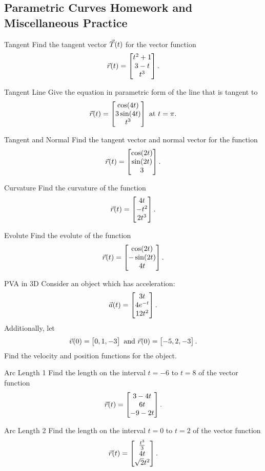 \renewcommand\thesubsection{\thesection.\Alph{subsection}}
\setcounter{subsection}{17}
\subsection{Parametric Curves Homework and Miscellaneous Practice}

\begin{pexercise}{Tangent}%
Find the tangent vector $\vec{T}(t)$ for the vector function $$\vec{r}(t)=\begin{bmatrix}t^2+1\\3-t\\t^3\end{bmatrix}.$$
\end{pexercise}

\begin{pexercise}{Tangent Line}%
Give the equation in parametric form of the line that is tangent to $$\vec{r}(t)=\begin{bmatrix}\cos(4t)\\ 3\sin(4t)\\ t^3\end{bmatrix}\text{ at } t=\pi.$$
\end{pexercise}

\begin{exercise}{Tangent and Normal}
Find the tangent vector and normal vector for the function $$\vec{r}(t)=\begin{bmatrix}\cos(2t)\\ \sin(2t)\\ 3\end{bmatrix}. $$
\end{exercise}

\begin{pexercise}{Curvature}%
Find the curvature of the function $$\vec{r}(t)=\begin{bmatrix}4t\\-t^2\\2t^3\end{bmatrix}. $$
\end{pexercise}

\begin{pexercise}{Evolute}%
Find the evolute of the function $$\vec{r}(t)=\begin{bmatrix}\cos(2t)\\-\sin(2t)\\4t\end{bmatrix}. $$
\end{pexercise}

\begin{pexercise}{PVA in 3D}%
Consider an object which has acceleration: $$\vec{a}(t)=\begin{bmatrix}3t\\4e^{-t}\\12t^2\end{bmatrix}.$$ Additionally, let $$\vec{v}(0)=\begin{bmatrix}0,1,-3\end{bmatrix}\text{ and }\vec{r}(0)=\begin{bmatrix}-5,2,-3\end{bmatrix}.$$ Find the velocity and position functions for the object.
\end{pexercise}

\begin{pexercise}{Arc Length 1}%
Find the length on the interval $t=-6$ to $t=8$ of the vector function $$\vec{r}(t)=\begin{bmatrix}3-4t\\6t\\-9-2t\end{bmatrix}. $$
\end{pexercise}

\begin{pexercise}{Arc Length 2}%
Find the length on the interval $t=0$ to $t=2$ of the vector function $$\vec{r}(t)=\begin{bmatrix}\frac{t^3}{3}\\4t\\ \sqrt{2}t^2\end{bmatrix}. $$
\end{pexercise}
\renewcommand\thesubsection{\thesection.\arabic{subsection}}